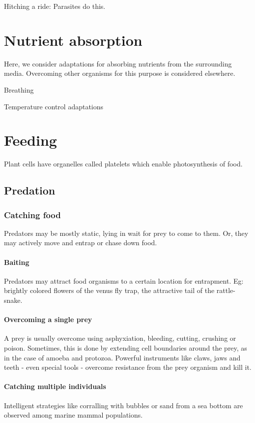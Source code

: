 \documentclass[oneside, article]{memoir}
\begin{document}
Hitching a ride: Parasites do this.

\chapter{Nutrient absorption}
Here, we consider adaptations for absorbing nutrients from the surrounding media. Overcoming other organisms for this purpose is considered elsewhere.

Breathing \tbc

Temperature control adaptations \tbc

\chapter{Feeding}
Plant cells have organelles called platelets which enable photosynthesis of food.

\section{Predation}
\subsection{Catching food}
Predators may be mostly static, lying in wait  for prey to come to them. Or, they may actively move and entrap or chase down food.

\subsubsection{Baiting}
Predators may attract food organisms to a certain location for entrapment. Eg: brightly colored flowers of the venus fly trap, the attractive tail of the rattle-snake.

\subsubsection{Overcoming a single prey}
A prey is usually overcome using asphyxiation, bleeding, cutting, crushing or poison. Sometimes, this is done by extending cell boundaries around the prey, as in the case of amoeba and protozoa.
Powerful instruments like claws, jaws and teeth - even special tools - overcome resistance from the prey organism and kill it.

\subsubsection{Catching multiple individuals}
Intelligent strategies like corralling with bubbles or sand from a sea bottom are observed among marine mammal populations.
\end{document}
